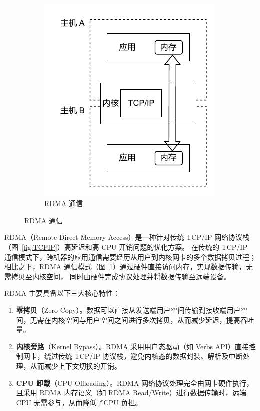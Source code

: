 {\begin{figure}[!htbp]
        ~~~~~%
        \begin{subfigure}[b]{0.40\textwidth}
            \includegraphics[width=\textwidth]{Img/RDMA通信.drawio.pdf}
            \caption{RDMA 通信}
            \label{fig:RDMA}
        \end{subfigure}
        \label{fig:DMA-RDMA}
    \end{figure}

    RDMA（Remote Direct Memory Access）是一种针对传统 TCP/IP 网络协议栈（图~\ref{fig:TCPIP}）高延迟和高 CPU 开销问题的优化方案。
    在传统的 TCP/IP 通信模式下，跨机器的应用通信需要经历从用户到内核网卡的多个数据拷贝过程；
    相比之下，RDMA 通信模式（图~\ref{fig:RDMA}）通过硬件直接访问内存，实现数据传输，无需拷贝至内核空间，
    同时由硬件完成协议处理并将数据传输至远端设备。

    RDMA 主要具备以下三大核心特性：
    \begin{enumerate}[label=\arabic*.]
        \item \textbf{零拷贝}（Zero-Copy）。数据可以直接从发送端用户空间传输到接收端用户空间，无需在内核空间与用户空间之间进行多次拷贝，从而减少延迟，提高吞吐量。
        \item \textbf{内核旁路}（Kernel Bypass）。RDMA 采用用户态驱动（如 Verbs API）直接控制网卡，绕过传统 TCP/IP 协议栈，避免内核态的数据封装、解析及中断处理，从而减少上下文切换的开销。
        \item \textbf{CPU 卸载}（CPU Offloading）。RDMA 网络协议处理完全由网卡硬件执行，
              且采用 RDMA 内存语义（如 RDMA Read/Write）进行数据传输时，远端 CPU 无需参与，从而降低了CPU 负担。
    \end{enumerate}

}

